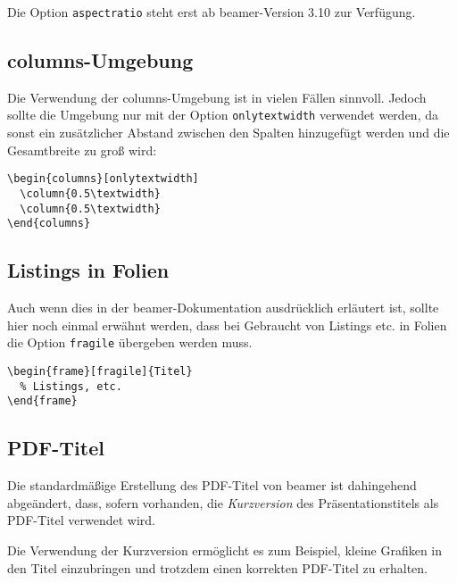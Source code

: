 \begin{hint}
Die Option \lstinline{aspectratio} steht erst ab beamer-Version 3.10
zur Verfügung.
\end{hint}


\subsection{columns-Umgebung}

Die Verwendung der columns-Umgebung ist in vielen Fällen sinnvoll.
Jedoch sollte die Umgebung nur mit der Option \lstinline{onlytextwidth}
verwendet werden, da sonst ein zusätzlicher Abstand zwischen den
Spalten hinzugefügt werden und die Gesamtbreite zu groß wird:

\begin{lstlisting}[morekeywords={onlytextwidth},keywordstyle=\color{tuOrange}]
\begin{columns}[onlytextwidth]
  \column{0.5\textwidth}
  \column{0.5\textwidth}
\end{columns}
\end{lstlisting}


\subsection{Listings in Folien}

Auch wenn dies in der beamer-Dokumentation ausdrücklich erläutert ist,
sollte hier noch einmal erwähnt werden, dass bei Gebraucht von Listings etc.
in Folien die Option \lstinline{fragile} übergeben werden muss.

\begin{lstlisting}
\begin{frame}[fragile]{Titel}
  % Listings, etc.
\end{frame}
\end{lstlisting}



\subsection{PDF-Titel}

Die standardmäßige Erstellung des PDF-Titel von beamer ist dahingehend
abgeändert, dass, sofern vorhanden, die \emph{Kurzversion} des Präsentationstitels
als PDF-Titel verwendet wird.

Die Verwendung der Kurzversion ermöglicht es zum Beispiel,
kleine Grafiken in den Titel einzubringen und
trotzdem einen korrekten PDF-Titel zu erhalten.


